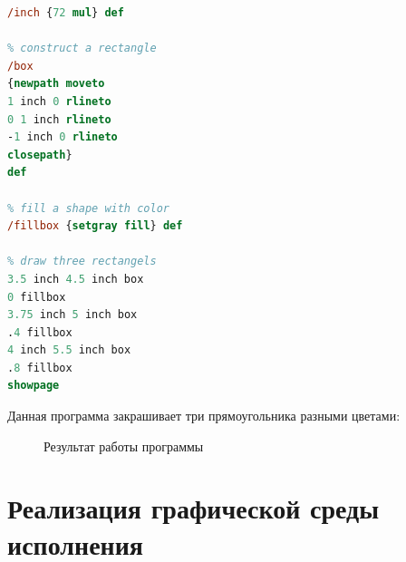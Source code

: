 \documentclass[14pt]{extarticle}
\begin{document}
\begin{lstlisting}[label=PostScript-example,caption=Простая программа на языке PostScript, frame = single, language = PostScript]
% transform inches to pixels
/inch {72 mul} def

% construct a rectangle
/box        
{newpath moveto
1 inch 0 rlineto
0 1 inch rlineto
-1 inch 0 rlineto
closepath} 
def

% fill a shape with color
/fillbox {setgray fill} def

% draw three rectangels
3.5 inch 4.5 inch box
0 fillbox
3.75 inch 5 inch box
.4 fillbox
4 inch 5.5 inch box
.8 fillbox
showpage
\end{lstlisting}

Данная программа закрашивает три прямоугольника разными цветами: 

\begin{figure} [h]
\caption{Результат работы программы}\label{pic_Rect}
\end{figure}


\pagebreak

\section{Реализация графической среды исполнения}
\sloppy
\end{document}
